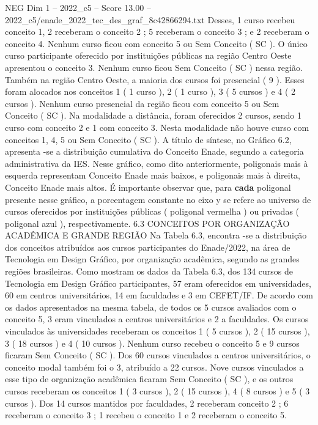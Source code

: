 \begin{textsample}{NEG Dim 1 – 2022\_c5 – Score 13.00 – 2022\_c5/enade\_2022\_tec\_des\_graf\_8c42866294.txt}
Desses, 1 curso recebeu conceito 1, 2 receberam o conceito 2 ; 5 receberam o conceito 3 ; e 2 receberam o conceito 4.
Nenhum curso ficou com conceito 5 ou Sem Conceito ( SC ).
O único curso participante oferecido por instituições públicas na região Centro Oeste apresentou o conceito 3.
Nenhum curso ficou Sem Conceito ( SC ) nessa região.
Também na região Centro Oeste, a maioria dos cursos foi presencial ( 9 ).
Esses foram alocados nos conceitos 1 ( 1 curso ), 2 ( 1 curso ), 3 ( 5 cursos ) e 4 ( 2 cursos ).
Nenhum curso presencial da região ficou com conceito 5 ou Sem Conceito ( SC ).
Na modalidade a distância, foram oferecidos 2 cursos, sendo 1 curso com conceito 2 e 1 com conceito 3.
Nesta modalidade não houve curso com conceitos 1, 4, 5 ou Sem Conceito ( SC ).
A título de síntese, no Gráfico 6.2, apresenta -se a distribuição cumulativa do Conceito Enade, segundo a categoria administrativa da IES.
Nesse gráfico, como dito anteriormente, poligonais mais à esquerda representam Conceito Enade mais baixos, e poligonais mais à direita, Conceito Enade mais altos.
É importante observar que, para \textbf{cada} poligonal presente nesse gráfico, a porcentagem constante no eixo y se refere ao universo de cursos oferecidos por instituições públicas ( poligonal vermelha ) ou privadas ( poligonal azul ), respectivamente. 6.3 CONCEITOS POR ORGANIZAÇÃO ACADÊMICA E GRANDE REGIÃO Na Tabela 6.3, encontra -se a distribuição dos conceitos atribuídos aos cursos participantes do Enade/2022, na área de Tecnologia em Design Gráfico, por organização acadêmica, segundo as grandes regiões brasileiras.
Como mostram os dados da Tabela 6.3, dos 134 cursos de Tecnologia em Design Gráfico participantes, 57 eram oferecidos em universidades, 60 em centros universitários, 14 em faculdades e 3 em CEFET/IF.
De acordo com os dados apresentados na mesma tabela, de todos os 5 cursos avaliados com o conceito 5, 3 eram vinculados a centros universitários e 2 a faculdades.
Os cursos vinculados às universidades receberam os conceitos 1 ( 5 cursos ), 2 ( 15 cursos ), 3 ( 18 cursos ) e 4 ( 10 cursos ).
Nenhum curso recebeu o conceito 5 e 9 cursos ficaram Sem Conceito ( SC ).
Dos 60 cursos vinculados a centros universitários, o conceito modal também foi o 3, atribuído a 22 cursos.
Nove cursos vinculados a esse tipo de organização acadêmica ficaram Sem Conceito ( SC ), e os outros cursos receberam os conceitos 1 ( 3 cursos ), 2 ( 15 cursos ), 4 ( 8 cursos ) e 5 ( 3 cursos ).
Dos 14 cursos mantidos por faculdades, 2 receberam conceito 2 ; 6 receberam o conceito 3 ; 1 recebeu o conceito 1 e 2 receberam o conceito 5.

\end{textsample}
